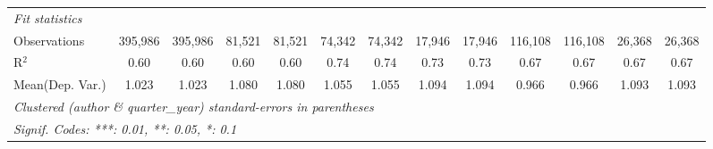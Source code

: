 \begin{tabular}{lcccccccccccc}
   \midrule
   \emph{Fit statistics}\\
   Observations                             & 395,986        & 395,986       & 81,521         & 81,521  & 74,342         & 74,342         & 17,946        & 17,946         & 116,108        & 116,108      & 26,368        & 26,368\\  
   R$^2$                                    & 0.60           & 0.60          & 0.60           & 0.60    & 0.74           & 0.74           & 0.73          & 0.73           & 0.67           & 0.67         & 0.67          & 0.67\\  
Mean(Dep. Var.) & 1.023 & 1.023 & 1.080 & 1.080 & 1.055 & 1.055 & 1.094 & 1.094 & 0.966 & 0.966 & 1.093 & 1.093 \\
   \midrule \midrule
   \multicolumn{13}{l}{\emph{Clustered (author \& quarter\_year) standard-errors in parentheses}}\\
   \multicolumn{13}{l}{\emph{Signif. Codes: ***: 0.01, **: 0.05, *: 0.1}}\\
\end{tabular}
\par\endgroup
